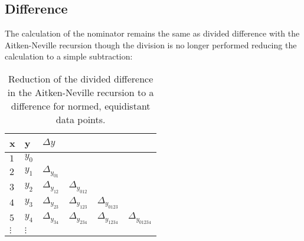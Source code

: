\subsection{Difference}

The calculation of the nominator remains the same as divided difference with
the Aitken-Neville recursion though the division is no longer performed
reducing the calculation to a simple subtraction:

\begin{table}[H]
	\centering
	\begin{tabular}{ l | l l l l l }
	\textbf{x}	& \textbf{y}	& $\Delta y$		&			& \\ \hline
	$1$		& $y_0$		&			&			&			& \\
	$2$		& $y_1$		& $\Delta_{y_{01}}$	&			&			& \\
	$3$		& $y_2$		& $\Delta_{y_{12}}$	& $\Delta_{y_{012}}$	&			& \\
	$4$		& $y_3$		& $\Delta_{y_{23}}$	& $\Delta_{y_{123}}$	& $\Delta_{y_{0123}}$	& \\
	$5$		& $y_4$		& $\Delta_{y_{34}}$	& $\Delta_{y_{234}}$	& $\Delta_{y_{1234}}$	& $\Delta_{y_{01234}}$ \\
	$\vdots$	& $\vdots$	&			&			&			& \\
	\end{tabular}
	\caption{Reduction of the divided difference in the Aitken-Neville
		recursion to a difference for normed, equidistant data points.}
\end{table}


